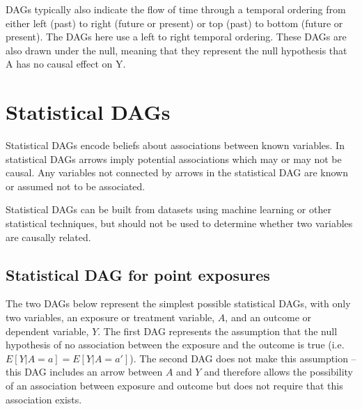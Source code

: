 \documentclass[a4paper]{report}
\begin{document}
DAGs typically also indicate the flow of time through a temporal ordering from either left (past) to right (future or present) or top (past) to bottom (future or present). The DAGs here use a left to right temporal ordering. These DAGs are also drawn under the null, meaning that they represent the null hypothesis that A has no causal effect on Y. 

\vspace{3mm}

\section{Statistical DAGs}
Statistical DAGs encode beliefs about associations between known variables. In statistical DAGs arrows imply potential associations which may or may not be causal. Any variables not connected by arrows in the statistical DAG are known or assumed not to be associated. 

Statistical DAGs can be built from datasets using machine learning or other statistical techniques, but should not be used to determine whether two variables are causally related.

\subsection{Statistical DAG for point exposures}
The two DAGs below represent the simplest possible statistical DAGs, with only two variables, an exposure or treatment variable, $A$, and an outcome or dependent variable, $Y$. The first DAG represents the assumption that the null hypothesis of no association between the exposure and the outcome is true (i.e. $E[Y|A=a]=E[Y|A=a']$). The second DAG does not make this assumption -- this DAG includes an arrow between $A$ and $Y$ and therefore allows the possibility of an association between exposure and outcome but does not require that this association exists.

\vspace{3mm}
\end{document}
